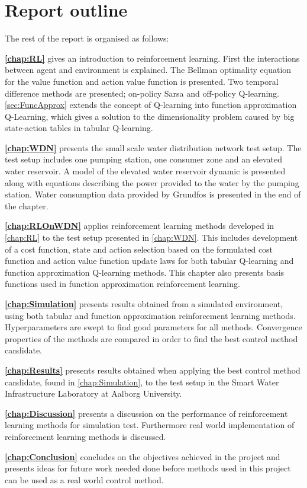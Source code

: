 \newpage \clearpage

\section{Report outline}\label{sec:projectOutline}

The rest of the report is organised as follows:

\textbf{\cref{chap:RL}} gives an introduction to reinforcement learning. First the interactions between agent and environment is explained. The Bellman optimality equation for the value function and action value function is presented. Two temporal difference methods are presented; on-policy Sarsa and off-policy Q-learning. \cref{sec:FuncApprox} extends the concept of Q-learning into function approximation Q-Learning, which gives a solution to the dimensionality problem caused by big state-action tables in tabular Q-learning.

\textbf{\cref{chap:WDN}} presents the small scale water distribution network test setup. The test setup includes one pumping station, one consumer zone and an elevated water reservoir. A model of the elevated water reservoir dynamic is presented along with equations describing the power provided to the water by the pumping station. Water consumption data provided by Grundfos is presented in the end of the chapter.

\textbf{\cref{chap:RLOnWDN}} applies reinforcement learning methods developed in \cref{chap:RL} to the test setup presented in \cref{chap:WDN}. This includes development of a cost function, state and action selection based on the formulated cost function and action value function update laws for both tabular Q-learning and function approximation Q-learning methods. This chapter also presents basis functions used in function approximation reinforcement learning. 

\textbf{\cref{chap:Simulation}} presents results obtained from a simulated environment, using both tabular and function approximation reinforcement learning methods. Hyperparameters are swept to find good parameters for all methods. Convergence properties of the methods are compared in order to find the best control method candidate. 

\textbf{\cref{chap:Results}} presents results obtained when applying the best control method candidate, found in \cref{chap:Simulation}, to the test setup in the Smart Water Infrastructure Laboratory at Aalborg University.

\textbf{\cref{chap:Discussion}} presents a discussion on the performance of reinforcement learning methods for simulation test. Furthermore real world implementation of reinforcement learning methods is discussed.

\textbf{\cref{chap:Conclusion}} concludes on the objectives achieved in the project and presents ideas for future work needed done before methods used in this project can be used as a real world control method.    

\newpage